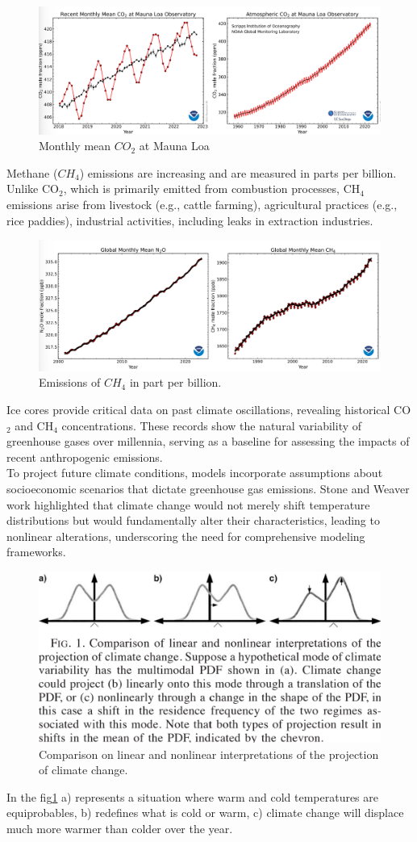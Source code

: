 \begin{figure}[htpb]
	\centering
	\includegraphics[width=0.5\linewidth]{uploads/co2image.png}
	\caption{Monthly mean $CO_2$ at Mauna Loa}

\end{figure}
Methane ($CH_4$) emissions are increasing and are measured in parts per billion. Unlike CO$_2$, which is primarily emitted from combustion processes, CH$_4$ emissions arise from livestock (e.g., cattle farming), agricultural practices (e.g., rice paddies), industrial activities, including leaks in extraction industries.
\begin{figure}[htpb]
	\centering
	\includegraphics[width=0.5\linewidth]{uploads/ch4.png}
	\caption{Emissions of $CH_4$ in part per billion.}

\end{figure}
Ice cores provide critical data on past climate oscillations, revealing historical CO$_2$ and CH$_4$ concentrations. These records show the natural variability of greenhouse gases over millennia, serving as a baseline for assessing the impacts of recent anthropogenic emissions.\\




To project future climate conditions, models incorporate assumptions about socioeconomic scenarios that dictate greenhouse gas emissions. Stone and Weaver\cite{Stone2000} work highlighted that climate change would not merely shift temperature distributions but would fundamentally alter their characteristics, leading to nonlinear alterations, underscoring the need for comprehensive modeling frameworks.

\begin{figure}[htpb]
	\centering
	\includegraphics[width=0.5\linewidth]{uploads/nonlinclimatechange.png}
	\caption{Comparison on linear and nonlinear interpretations of the projection of climate change.}
	\label{fig:clim model}
\end{figure}
In the fig\ref{fig:clim model} a) represents a situation where warm and cold temperatures are equiprobables, b) redefines what is cold or warm, c) climate change will displace much more warmer than colder over the year.

